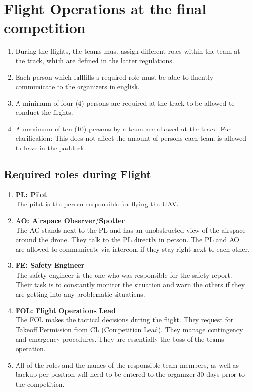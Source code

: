     \section{Flight Operations at the final competition}
    \begin{enumerate}
      \item During the flights, the teams must assign different roles within the team at the track, which are defined in the latter regulations.
      \item Each person which fullfills a required role must be able to fluently communicate to the organizers in english.
      \item A minimum of four (4) persons are required at the track to be allowed to conduct the flights.
      \item A maximum of ten (10) persons by a team are allowed at the track. For clarification: This does not affect the amount of persons each team is allowed to have in the paddock.  
    \end{enumerate}

    \subsection{Required roles during Flight}
    \begin{enumerate}
      \item \textbf{PL: Pilot}\\The pilot is the person responsible for flying the UAV.
      \item \textbf{AO: Airspace Observer/Spotter}\\The AO stands next to the PL and has an unobstructed view of the airspace around the drone. They talk to the PL directly in person. The PL and AO are allowed to communicate via intercom if they stay right next to each other. 
      \item \textbf{FE: Safety Engineer}\\The safety engineer is the one who was responsible for the safety report. Their task is to constantly monitor the situation and warn the others if they are getting into any problematic situations. 
      \item \textbf{FOL: Flight Operations Lead}\\The FOL makes the tactical decisions during the flight. They request for Takeoff Permission from CL (Competition Lead). They manage contingency and emergency procedures. They are essentially the boss of the teams operation.
      \item All of the roles and the names of the responsible team members, as well as backup per position will need to be entered to the organizer 30 days prior to the competition. 
    \end{enumerate}


